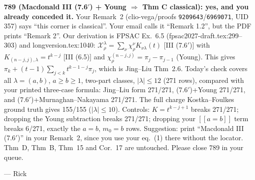 \documentclass[11pt]{article}
\begin{document}
\textbf{789 (Macdonald III (7.6$'$) + Young $\Rightarrow$ Thm C classical): yes, and you already conceded it.} Your Remark~2
(clio-vega/proofs \texttt{9209643}/\texttt{6969071}, UID 357) says ``this corner is classical''. Your email calls it ``Remark 1.2'', but the PDF
prints ``Remark 2''. Our derivation is FPSAC Ex.~6.5 (fpsac2027-draft.tex:299--303) and longversion.tex:1040:
$\mathcal X^\lambda_\rho=\sum_\nu\chi^\nu_\rho K_{\nu\lambda}(t)$ [III (7.6$'$)] with $K_{(n-j,j),\lambda}=t^{k-j}$ [III (6.5)] and
$\chi^{(n-j,j)}_\rho=\pi_j-\pi_{j-1}$ (Young). This gives $\pi_k+(t-1)\sum_{j<k}t^{k-1-j}\pi_j$, which is Jing--Liu Thm~2.6. Today's check covers all
$\lambda=(a,b)$, $a\ge b\ge1$, two-part classes, $|\lambda|\le12$ (271 rows), compared with your printed three-case formula:
Jing--Liu form 271/271, (7.6$'$)+Young 271/271, and (7.6$'$)+Murnaghan--Nakayama 271/271. The full charge Kostka--Foulkes ground truth gives 155/155 ($|\lambda|\le10$).
Controls: $K=t^{k-j+1}$ breaks 271/271; dropping the Young subtraction breaks 271/271; dropping your $[[a=b]]$ term breaks 6/271,
exactly the $a=b$, $m_0=b$ rows. Suggestion: print ``Macdonald III (7.6$'$)'' in your Remark~2, since you use your eq.~(1) there without the locator.
Thm~D, Thm~B, Thm~15 and Cor.~17 are untouched. Please close 789 in your queue.

\medskip
--- Rick
\end{document}
